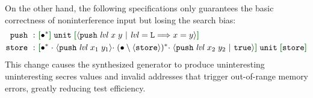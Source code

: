 %
  On the other hand, the following specifications only guarantees the basic correctness of noninterference input but losing the search bias:
  {\small %
  \begin{align*}
    \eff{push} ~:~
    & \effLR{\allA} \;\Code{unit}\; \effLR{\msgB{push}{\I{lvl}\;x\;y}{\I{lvl} = \Code{L} \impl x = y}}
    \\
    \eff{store} ~:~
    & \effLR{\allA\; \seqA\; \msgA{push}{\I{lvl}\;x_1\;y_1} \seqA\;
      (\anyA \setminus \msgC{store})^* \seqA\;
      \msgB{push}{\I{lvl}\;x_2\;y_2}{\true}}\; \Code{unit}\;
      \effLR{\eff{store}}
  \end{align*}}\noindent
  This change causes the synthesized generator to produce uninteresting uninteresting secres values and invalid addresses that trigger out-of-range memory errors, greatly reducing test efficiency.

